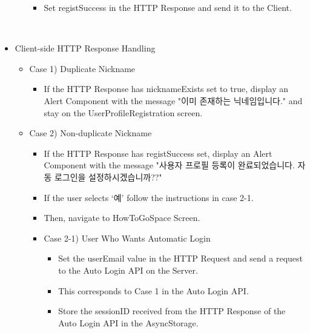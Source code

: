 \documentclass[conference]{IEEEtran}
\begin{document}
\begin{itemize}
\begin{itemize}
\begin{itemize}
            \item Set registSuccess in the HTTP Response and send it to the Client.
        \end{itemize}
        \\
    \end{itemize}
    \item Client-side HTTP Response Handling
    \begin{itemize}
        \item Case 1) Duplicate Nickname
        \begin{itemize}
            \item If the HTTP Response has nicknameExists set to true, display an Alert Component with the message "이미 존재하는 닉네임입니다." and stay on the UserProfileRegistration screen.
        \end{itemize}
        \item Case 2) Non-duplicate Nickname
        \begin{itemize}
            \item If the HTTP Response has registSuccess set, display an Alert Component with the message "사용자 프로필 등록이 완료되었습니다. 자동 로그인을 설정하시겠습니까??"
            \item If the user selects ‘예’ follow the instructions in case 2-1.
            \item Then, navigate to HowToGoSpace Screen.
            \item Case 2-1) User Who Wants Automatic Login
            \begin{itemize}
                \item Set the userEmail value in the HTTP Request and send a request to the Auto Login API on the Server. 
                \item This corresponds to Case 1 in the Auto Login API.
                \item Store the sessionID received from the HTTP Response of the Auto Login API in the AsyncStorage.
            \end{itemize}
        \end{itemize}
    \end{itemize} 
\end{itemize}
\end{document}
